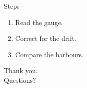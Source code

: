 \documentclass{beamer}
\begin{document}
\begin{frame}{Steps}
  \begin{enumerate}[<+->]
    \item Read the gauge.
    \item Correct for the drift.
    \item Compare the harbours.
  \end{enumerate}
\end{frame}

\begin{frame}
  \centering
  \Large Thank you.\\[1em]
  \normalsize Questions?
\end{frame}
\end{document}

